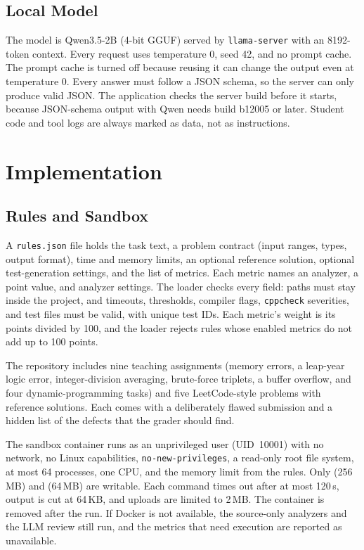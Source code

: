 \documentclass[conference]{IEEEtran}
\begin{document}
\subsection{Local Model}
The model is Qwen3.5-2B (4-bit GGUF) served by \texttt{llama-server} with an
8192-token context. Every request uses temperature 0, seed 42, and no prompt
cache. The prompt cache is turned off because reusing it can change the output
even at temperature 0. Every answer must follow a JSON schema, so the server can
only produce valid JSON. The application checks the server build before it
starts, because JSON-schema output with Qwen needs build b12005 or later. Student
code and tool logs are always marked as data, not as instructions.

\section{Implementation}

\subsection{Rules and Sandbox}
A \texttt{rules.json} file holds the task text, a problem contract (input
ranges, types, output format), time and memory limits, an optional reference
solution, optional test-generation settings, and the list of metrics. Each
metric names an analyzer, a point value, and analyzer settings. The loader checks
every field: paths must stay inside the project, and timeouts, thresholds,
compiler flags, \texttt{cppcheck} severities, and test files must be valid, with
unique test IDs. Each metric's weight is its points divided by 100, and the
loader rejects rules whose enabled metrics do not add up to 100 points.

The repository includes nine teaching assignments (memory errors, a leap-year
logic error, integer-division averaging, brute-force triplets, a buffer
overflow, and four dynamic-programming tasks) and five LeetCode-style problems
with reference solutions. Each comes with a deliberately flawed submission and a
hidden list of the defects that the grader should find.

The sandbox container runs as an unprivileged user (UID~10001) with no network,
no Linux capabilities, \texttt{no-new-privileges}, a read-only root file system,
at most 64 processes, one CPU, and the memory limit from the rules. Only
 (256\,MB) and  (64\,MB) are writable. Each command
times out after at most 120\,s, output is cut at 64\,KB, and uploads are limited
to 2\,MB. The container is removed after the run. If Docker is not available, the
source-only analyzers and the LLM review still run, and the metrics that need
execution are reported as unavailable.
\end{document}
